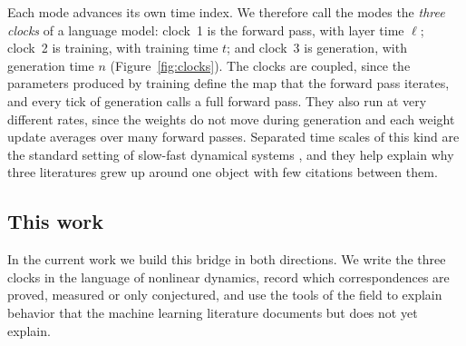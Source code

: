 Each mode advances its own time index. We therefore call the modes the \emph{three clocks} of a language model: clock~1 is the forward pass, with layer time $\ell$; clock~2 is training, with training time $t$; and clock~3 is generation, with generation time $n$ (Figure~\ref{fig:clocks}). The clocks are coupled, since the parameters produced by training define the map that the forward pass iterates, and every tick of generation calls a full forward pass. They also run at very different rates, since the weights do not move during generation and each weight update averages over many forward passes. Separated time scales of this kind are the standard setting of slow-fast dynamical systems \citep{strogatz2018nonlinear}, and they help explain why three literatures grew up around one object with few citations between them.

\subsection{This work}
\label{sec:thiswork}

In the current work we build this bridge in both directions. We write the three clocks in the language of nonlinear dynamics, record which correspondences are proved, measured or only conjectured, and use the tools of the field to explain behavior that the machine learning literature documents but does not yet explain.

